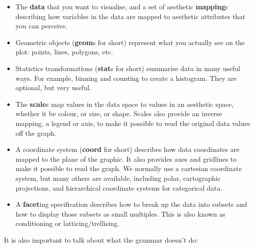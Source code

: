 \begin{itemize}
	\item The \textbf{data} that you want to visualise, and a set of aesthetic \textbf{mapping}s describing how variables in the data are mapped to aesthetic attributes that you can perceive.

	\item Geometric objects (\textbf{geom}s for short) represent what you actually see on the plot: points, lines, polygons, etc.

	\item Statistics transformations (\textbf{stat}s for short) summarise data in many useful ways.  For example, binning and counting to create a histogram.  They are optional, but very useful.

	\item The \textbf{scale}s map values in the data space to values in an aesthetic space, whether it be colour, or size, or shape.  Scales also provide an inverse mapping, a legend or axis, to make it possible to read the original data values off the graph.

	\item A coordinate system (\textbf{coord} for short) describes how data coordinates are mapped to the plane of the graphic.  It also provides axes and gridlines to make it possible to read the graph.  We normally use a cartesian coordinate system, but many others are available, including polar, cartographic projections, and hierarchical coordinate systems for categorical data.

	\item A \textbf{facet}ing specification describes how to break up the data into subsets and how to display those subsets as small multiples.  This is also known as conditioning or latticing/trellising.

\end{itemize}

It is also important to talk about what the grammar doesn't do:

